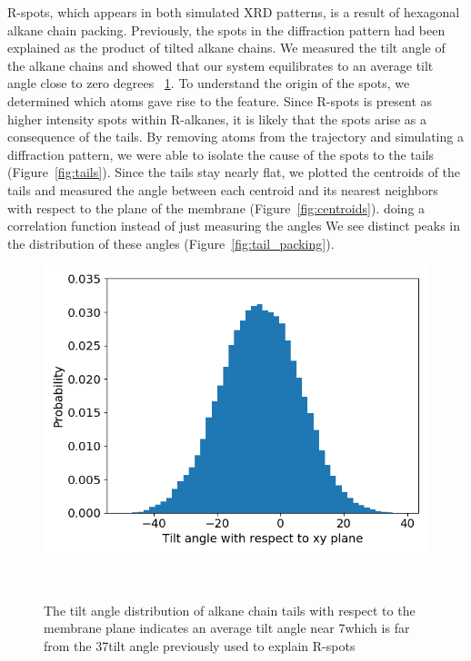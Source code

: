 \documentclass{article}
\begin{document}
  R-spots, which appears in both simulated XRD patterns, is a result of
  hexagonal alkane chain packing. Previously, the spots in the diffraction
  pattern had been explained as the product of tilted alkane chains. We measured
  the tilt angle of the alkane chains and showed that our system equilibrates to
  an average tilt angle close to zero degrees ~\ref{fig:tilt}. To understand the
  origin of the spots, we determined which atoms gave rise to the feature. Since
  R-spots is present as higher intensity spots within R-alkanes, it is likely
  that the spots arise as a consequence of the tails. By removing atoms from the
  trajectory and simulating a diffraction pattern, we were able to isolate the
  cause of the spots to the tails (Figure~\ref{fig:tails}).  Since the tails stay
  nearly flat, we plotted the centroids of the tails and measured the angle
  between each centroid and its nearest neighbors with respect to the plane of
  the membrane (Figure~\ref{fig:centroids}).  %
  doing a correlation function instead of just measuring the angles We see
  distinct peaks in the distribution of these angles 
  (Figure~\ref{fig:tail_packing}).

  \begin{figure}
  \centering
  \includegraphics[width=0.5\linewidth]{tilt_dist.png}
  \caption{The tilt angle distribution of alkane chain tails with respect to the membrane plane
  indicates an average tilt angle near 7\degree which is far from the 37\degree tilt angle 
  previously used to explain R-spots}~\label{fig:tilt}
  \end{figure}
\end{document}
